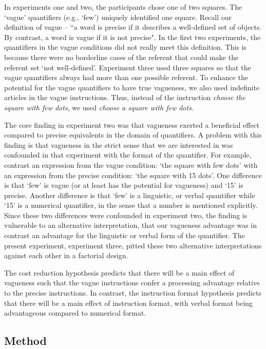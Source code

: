 \documentclass[doc,floatmark]{apa}
\begin{document}
In experiments one and two, the participants chose one of two squares. The `vague' quantifiers (e.g., `few') uniquely identified one square. Recall our definition of vague  -- ``a word is precise if it describes a well-defined set of objects. By contrast, a word is vague if it is not precise".  In the first two experiments, the quantifiers in the vague conditions did not really meet this definition. This is because there were no borderline cases of the referent that could make the referent set `not well-defined'. Experiment three used three squares so that the vague quantifiers always had more than one possible referent. To enhance the potential for the vague quantifiers to have true vagueness, we also used indefinite articles in the vague instructions. Thus, instead of the instruction \emph{choose the square with few dots}, we used \emph{choose a square with few dots}.

The core finding in experiment two was that vagueness exerted a beneficial effect compared to precise equivalents in the domain of quantifiers. A problem with this finding is that vagueness in the strict sense that we are interested in was confounded in that experiment with the format of the quantifier. For example, contrast an expression from the vague condition: `the square with few dots' with an expression from the precise condition: `the square with 15 dots'. One difference is that `few' is vague (or at least has the potential for vagueness) and `15' is precise. Another difference is that `few' is a linguistic, or verbal quantifier while `15' is a numerical quantifier, in the sense that a number is mentioned explicitly. Since these two differences were confounded in experiment two, the finding is vulnerable to an alternative interpretation, that our vagueness advantage was in contrast an advantage for the linguistic or verbal form of the quantifier. The present experiment, experiment three, pitted these two alternative interpretations against each other in a factorial design.

The cost reduction hypothesis predicts that there will be a main effect of vagueness such that the vague instructions confer a processing advantage relative to the precise instructions.  In contrast, the instruction format hypothesis predicts that there will be a main effect of instruction format, with verbal format being advantageous compared to numerical format.

\subsection{Method}
\end{document}
